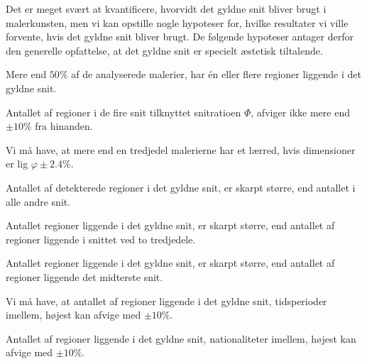 {
{\sffamily Det er meget svært at kvantificere, hvorvidt det gyldne snit
bliver brugt i malerkunsten, men vi kan opstille nogle hypoteser for,
hvilke resultater vi ville forvente, hvis det gyldne snit bliver brugt.
De følgende hypoteser antager derfor den generelle opfattelse, at det
gyldne snit er specielt æstetisk tiltalende.
}

\begin{hypotese}
    Mere end $50\%$ af de analyserede malerier, har én eller flere
    regioner liggende i det gyldne snit.
    \label{hypo_binaer}
\end{hypotese}

\begin{hypotese}
    Antallet af regioner i de fire snit tilknyttet snitratioen
    $\varPhi$, afviger ikke mere end $\pm10\%$ fra hinanden.
    \label{hypo_fire_g_snit}
\end{hypotese}

\begin{hypotese}
    Vi må have, at mere end en tredjedel malerierne har et lærred, hvis
    dimensioner er lig $\varphi\pm2.4\%$.
    \label{hypo_golden_ractangle}
\end{hypotese}

\begin{hypotese}
    Antallet af detekterede regioner i det gyldne snit, er skarpt
    større, end antallet i alle andre snit.
    \label{hypo_alle_andre_snit}
\end{hypotese}

\begin{hypotese}
    Antallet regioner liggende i det gyldne snit, er skarpt større, end
    antallet af regioner liggende i snittet ved to tredjedele.
    \label{hypo_to_tredjedele}
\end{hypotese}

\begin{hypotese}
    Antallet regioner liggende i det gyldne snit, er skarpt større, end
    antallet af regioner liggende det midterste snit.
    \label{hypo_midten}
\end{hypotese}

\begin{hypotese}
    Vi må have, at antallet af regioner liggende i det gyldne snit,
    tidsperioder imellem, højest kan afvige med $\pm10\%$.
	\label{hypo_tid}
\end{hypotese}

\begin{hypotese}
    Antallet af regioner liggende i det gyldne snit, nationaliteter
    imellem, højest kan afvige med $\pm10\%$.
	\label{hypo_nation}
\end{hypotese}

}
